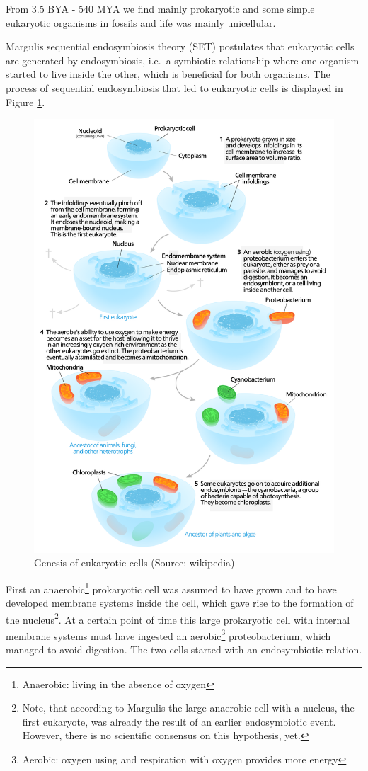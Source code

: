\documentclass[
  11pt,
]{book}
\begin{document}
From 3.5 BYA - 540 MYA we find mainly prokaryotic and some simple eukaryotic organisms in fossils and life was mainly unicellular.

Margulis sequential endosymbiosis theory (SET) postulates that eukaryotic cells are generated by endosymbiosis, i.e.~a symbiotic relationship where one organism started to live inside the other, which is beneficial for both organisms. The process of sequential endosymbiosis that led to eukaryotic cells is displayed in Figure \ref{fig:endosymbiosis}.

\begin{figure}

{\centering \includegraphics[width=0.8\linewidth]{./figs/endosymbiosis} 

}

\caption{Genesis of eukaryotic cells (Source: wikipedia)}\label{fig:endosymbiosis}
\end{figure}

First an anaerobic\footnote{Anaerobic: living in the absence of oxygen} prokaryotic cell was assumed to have grown and to have developed membrane systems inside the cell, which gave rise to the formation of the nucleus\footnote{Note, that according to Margulis the large anaerobic cell with a nucleus, the first eukaryote, was already the result of an earlier endosymbiotic event. However, there is no scientific consensus on this hypothesis, yet.}.
At a certain point of time this large prokaryotic cell with internal membrane systems must have ingested an aerobic\footnote{Aerobic: oxygen using and respiration with oxygen provides more energy} proteobacterium, which managed to avoid digestion. The two cells started with an endosymbiotic relation.
\end{document}
